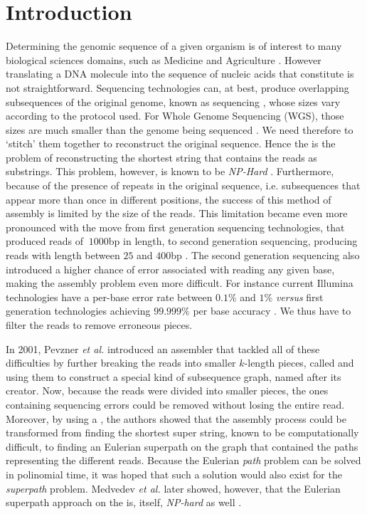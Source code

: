 \chapter{Introduction}

Determining the genomic sequence of a given organism is of interest to many biological sciences domains, such as Medicine and Agriculture \cite{Lohmann2014, Imelfort2009}. However translating a DNA molecule into the sequence of nucleic acids that constitute is not straightforward. Sequencing technologies can, at best, produce overlapping subsequences of the original genome, known as sequencing , whose sizes vary according to the protocol used. For Whole Genome Sequencing (WGS), those sizes are much smaller than the genome being sequenced \cite{Miller2010}. We need therefore to `stitch' them together to reconstruct the original sequence. Hence the  is the problem of reconstructing the shortest string that contains the reads as substrings. This problem, however, is known to be \emph{NP-Hard} \cite{Gallant1980}. Furthermore, because of the presence of repeats in the original sequence, i.e. subsequences that appear more than once in different positions, the success of this method of assembly is limited by the size of the reads. This limitation became even more pronounced with the move from first generation sequencing technologies, that produced reads of $~1000$bp in length, to second generation sequencing, producing reads with length between $25$ and $400$bp \cite{Shendure2008}. The second generation sequencing also introduced a higher chance of error associated with reading any given base, making the assembly problem even more difficult. For instance current Illumina technologies have a per-base error rate between $0.1\%$ and $1\%$ \cite{Metzker2010} \emph{versus} first generation technologies achieving $99.999\%$ per base accuracy \cite{Shendure2008}. We thus have to filter the reads to remove erroneous pieces.

In 2001, Pevzner \emph{et al.} \cite{Pevzner2001} introduced an assembler that tackled all of these difficulties by further breaking the reads into smaller $k$-length pieces, called  and using them to construct a special kind of subsequence graph, named \keyterm{\dBG} after its creator. Now, because the reads were divided into smaller pieces, the ones containing sequencing errors could be removed without losing the entire read. Moreover, by using a \dBG, the authors showed that the assembly process could be transformed from finding the shortest super string, known to be computationally difficult, to finding an Eulerian superpath on the graph that contained the paths representing the different reads. Because the Eulerian \emph{path} problem can be solved in polinomial time, it was hoped that such a solution would also exist for the \emph{superpath} problem. Medvedev \emph{et al.} later showed, however, that the Eulerian superpath approach on the \dBG is, itself, \emph{NP-hard} as well \cite{Medvedev2007, Kapun2013}.

